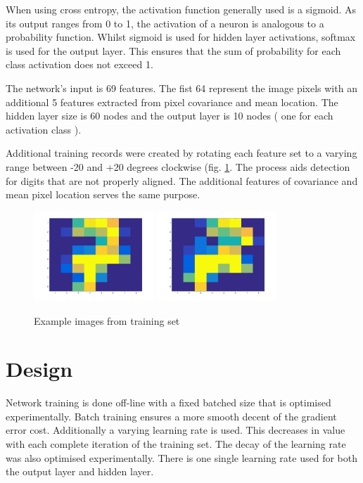 \documentclass[11]{article}
\begin{document}
When using cross entropy, the activation function generally used is a sigmoid. As its output ranges from 0 to 1, the activation of a neuron is analogous to a probability function. Whilst sigmoid is used for hidden layer activations, softmax is used for the output layer. This ensures that the sum of probability for each class activation does not exceed 1. 

The network's input is 69 features. The fist 64 represent the image pixels with an additional 5 features extracted from pixel covariance and mean location.  The hidden layer size is 60 nodes and the output layer is 10 nodes ( one for each activation class ). 

Additional training records were created by rotating each feature set to a varying range between -20 and +20 degrees clockwise (fig. \ref{fig:rotated}. The process aids detection for digits that are not properly aligned. The additional features of covariance and mean pixel location serves the same purpose. 
\begin{figure}[h]
\centering
\includegraphics[width=0.4\textwidth]{seven.png}
\includegraphics[width=0.4\textwidth]{seven_rotated.png}
\caption{Example images from training set}
\label{fig:rotated}
\end{figure}
\section{Design}

Network training is done off-line with a fixed batched size that is optimised experimentally. Batch training ensures a more smooth decent of the gradient error cost. Additionally a varying learning rate is used. This decreases in value with each complete iteration of the training set. The decay of the learning rate was also optimised experimentally. There is one single learning rate used for both the output layer and hidden layer.
\end{document}

